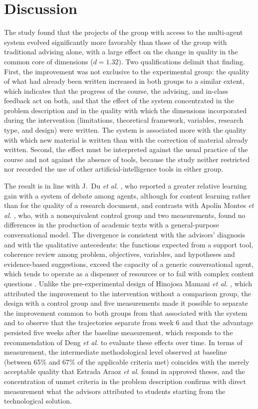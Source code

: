 \documentclass[journal]{IEEEtran}
\begin{document}
\section{Discussion}

The study found that the projects of the group with access to the multi-agent system evolved significantly more favorably than those of the group with traditional advising alone, with a large effect on the change in quality in the common core of dimensions ($d = 1.32$). Two qualifications delimit that finding. First, the improvement was not exclusive to the experimental group: the quality of what had already been written increased in both groups to a similar extent, which indicates that the progress of the course, the advising, and in-class feedback act on both, and that the effect of the system concentrated in the problem description and in the quality with which the dimensions incorporated during the intervention (limitations, theoretical framework, variables, research type, and design) were written. The system is associated more with the quality with which new material is written than with the correction of material already written. Second, the effect must be interpreted against the usual practice of the course and not against the absence of tools, because the study neither restricted nor recorded the use of other artificial-intelligence tools in either group.

The result is in line with J.\ Du \emph{et al.} \cite{duj2025}, who reported a greater relative learning gain with a system of debate among agents, although for content learning rather than for the quality of a research document, and contrasts with Apol\'in Montes \emph{et al.} \cite{apolin2024}, who, with a nonequivalent control group and two measurements, found no differences in the production of academic texts with a general-purpose conversational model. The divergence is consistent with the advisors' diagnosis and with the qualitative antecedents: the functions expected from a support tool, coherence review among problem, objectives, variables, and hypotheses and evidence-based suggestions, exceed the capacity of a generic conversational agent, which tends to operate as a dispenser of resources \cite{ortega2021} or to fail with complex content questions \cite{arredondo2020}. Unlike the pre-experimental design of Hinojosa Mamani \emph{et al.} \cite{hinojosa2024}, which attributed the improvement to the intervention without a comparison group, the design with a control group and five measurements made it possible to separate the improvement common to both groups from that associated with the system and to observe that the trajectories separate from week 6 and that the advantage persisted five weeks after the baseline measurement, which responds to the recommendation of Deng \emph{et al.} \cite{deng2025} to evaluate these effects over time. In terms of measurement, the intermediate methodological level observed at baseline (between 65\% and 67\% of the applicable criteria met) coincides with the merely acceptable quality that Estrada Araoz \emph{et al.} \cite{estrada2022} found in approved theses, and the concentration of unmet criteria in the problem description confirms with direct measurement what the advisors attributed to students starting from the technological solution.
\end{document}
